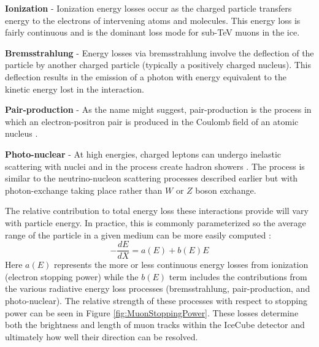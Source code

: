 \documentclass{gatech-thesis}
\begin{document}
\begin{adjustwidth}{2.5em}{2.5em}
\setlength{\parindent}{0pt}
\textbf{Ionization} - Ionization energy losses occur as the charged particle transfers energy to the electrons of intervening atoms and molecules. This energy loss is fairly continuous and is the dominant loss mode for sub-TeV muons in the ice.

\textbf{Bremsstrahlung} - Energy losses via bremsstrahlung involve the deflection of the particle by another charged particle (typically a positively charged nucleus). This deflection results in the emission of a photon with energy equivalent to the kinetic energy lost in the interaction.

\textbf{Pair-production} - As the name might suggest, pair-production is the process in which an electron-positron pair is produced in the Coulomb field of an atomic nucleus \cite{2001ADNDT..78..183G}.

\textbf{Photo-nuclear} - At high energies, charged leptons can undergo inelastic scattering with nuclei and in the process create hadron showers \cite{2003PhRvD..67c4027B}. The process is similar to the neutrino-nucleon scattering processes described earlier but with photon-exchange taking place rather than $W$ or $Z$ boson exchange.
\end{adjustwidth}
\setlength{\parindent}{17.5pt}
The relative contribution to total energy loss these interactions provide will vary with particle energy. In practice, this is commonly parameterized so the average range of the particle in a given medium can be more easily computed \cite{2001ADNDT..78..183G}:
\begin{equation}
-\frac{dE}{dX} = a(E) + b(E) E
\end{equation}
Here $a(E)$ represents the more or less continuous energy losses from ionization (electron stopping power) while the $b(E)$ term includes the contributions from the various radiative energy loss processes (bremsstrahlung, pair-production, and photo-nuclear). The relative strength of these processes with respect to stopping power can be seen in Figure \ref{fig:MuonStoppingPower}. These losses determine both the brightness and length of muon tracks within the IceCube detector and ultimately how well their direction can be resolved.
\end{document}
